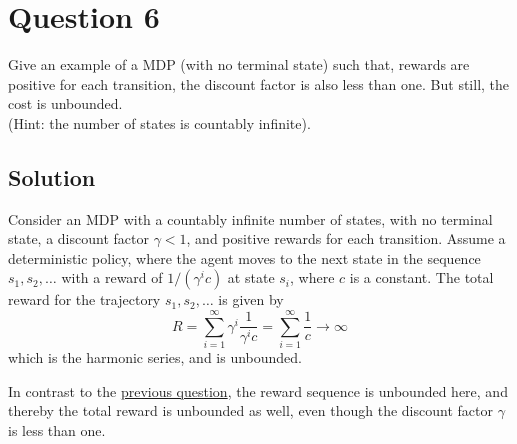 \section*{Question 6}

Give an example of a MDP (with no terminal state) such that, rewards are positive for each transition, the discount factor is also less than one.
But still, the cost is unbounded. \\
(Hint: the number of states is countably infinite).

\subsection*{Solution}

Consider an MDP with a countably infinite number of states, with no terminal state, a discount factor \( \gamma < 1 \), and positive rewards for each transition.
Assume a deterministic policy, where the agent moves to the next state in the sequence \( s_1, s_2, \dots \) with a reward of \( 1/(\gamma^i c) \) at state \( s_i \), where \( c \) is a constant.
The total reward for the trajectory \( s_1, s_2, \dots \) is given by
\[
    R = \sum_{i=1}^{\infty} \gamma^i \frac{1}{\gamma^i c} = \sum_{i=1}^{\infty} \frac{1}{c} \longrightarrow \infty
\]
which is the harmonic series, and is unbounded.

In contrast to the \hyperref[sec:q5]{previous question}, the reward sequence is unbounded here, and thereby the total reward is unbounded as well, even though the discount factor \( \gamma \) is less than one.
